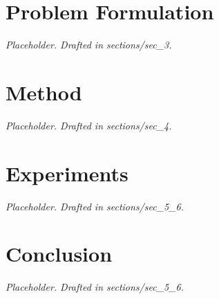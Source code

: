 \documentclass[journal,10pt]{IEEEtran}
\begin{document}




\section{Problem Formulation}
\label{sec:problem}
\textit{Placeholder. Drafted in sections/sec\_3.}

\section{Method}
\label{sec:method}
\textit{Placeholder. Drafted in sections/sec\_4.}

\section{Experiments}
\label{sec:experiments}
\textit{Placeholder. Drafted in sections/sec\_5\_6.}

\section{Conclusion}
\label{sec:conclusion}
\textit{Placeholder. Drafted in sections/sec\_5\_6.}



\end{document}

